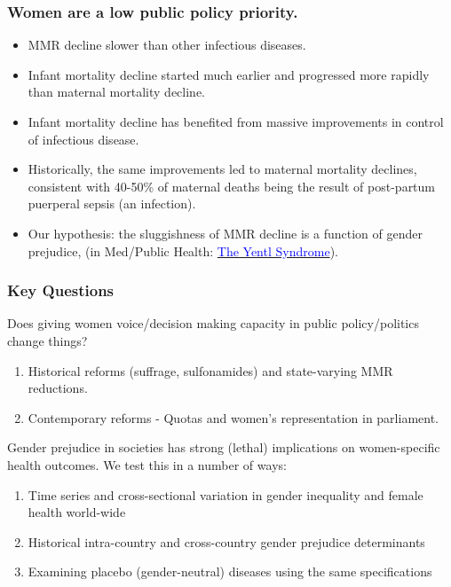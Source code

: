 \documentclass[10pt,letterpaper,subeqn]{beamer}
\begin{document}
\begin{frame}
\frametitle{Women are a low public policy priority.}
\begin{itemize}
  \setlength{\itemsep}{20pt}
	\item MMR decline slower than other infectious diseases.
	\item Infant mortality decline started much earlier and progressed more rapidly 
        than maternal mortality decline.
	\item Infant mortality decline has benefited from massive improvements in 
        control of infectious disease. 
	\item Historically, the same improvements led to maternal mortality declines, 
        consistent with 40-50\% of maternal deaths being the result of post-partum
        puerperal sepsis (an infection).
  \item Our hypothesis: the sluggishness of MMR decline is a function of gender 
        prejudice, (in Med/Public Health: \hyperlink{Yentl}{\textcolor{blue}
        {The Yentl Syndrome}}).
\end{itemize}
\end{frame}


\begin{frame}
\frametitle{Key Questions}
Does giving women voice/decision making capacity in public policy/politics change things? 
\vspace{4.5mm}
\begin{enumerate}
  \setlength{\itemsep}{9.5pt}
	\item Historical reforms (suffrage, sulfonamides) and state-varying MMR reductions.
  \item Contemporary reforms - Quotas and women's representation in parliament.
\end{enumerate}
\vspace{5mm}
Gender prejudice in societies has strong (lethal) implications on women-specific 
health outcomes.  We test this in a number of ways:
\vspace{4.5mm}
\begin{enumerate}
  \setlength{\itemsep}{9.5pt}
  \item Time series and cross-sectional variation in gender inequality and female
        health world-wide
  \item Historical intra-country and cross-country gender prejudice determinants
  \item Examining placebo (gender-neutral) diseases using the same specifications
\end{enumerate}
\end{frame}
\end{document}
